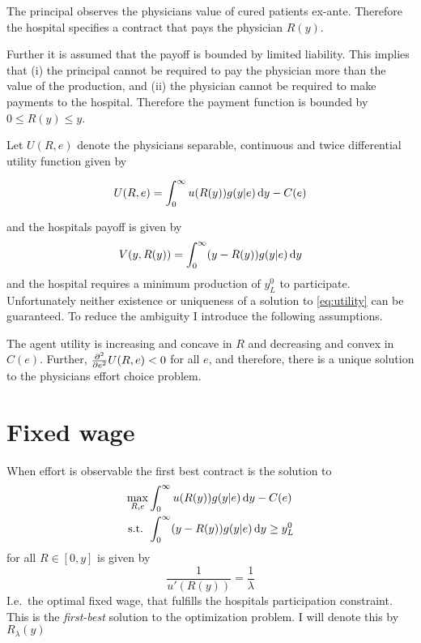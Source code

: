 The principal observes the physicians value of cured patients ex-ante. Therefore the hospital specifies a contract that pays the physician $R(y)$.

Further it is assumed that the payoff is bounded by limited liability. This implies that (i) the principal cannot be required to pay the physician more than the value of the production, and (ii) the physician cannot be required to make payments to the hospital.  Therefore the payment function is bounded by $0\leq R(y)\leq y$.

Let $U(R,e)$ denote the physicians separable, continuous and twice differential utility function given by 

\begin{align}
    U(R,e)=\int_0^\infty u(R(y))g(y|e)\dif y-C(e) \label{eq:utility}
\end{align}

and the hospitals payoff is given by 
\begin{align}
    V(y,R(y))=\int_0^\infty (y-R(y))g(y|e)\dif y
\end{align}
and the hospital requires a minimum production of $y_L^0$ to participate. 
Unfortunately neither existence or uniqueness of a solution to \cref{eq:utility} can be guaranteed. To reduce the ambiguity I introduce the following assumptions. 
\begin{assumption}
\label{asump:unique-solution}
The agent utility is increasing and concave in $R$ and decreasing and convex in $C(e)$. Further, $\pder[][2]{e}U(R,e)<0$ for all $e$, and therefore, there is a unique solution to the physicians effort choice problem.
\end{assumption}

\section{Fixed wage} %
\label{sec:fixed_wage}
When effort is observable the first best contract is the solution to 
\begin{subequations}
\label{eq:khun-tucker-fw}
\begin{align}
    \max_{R,e} & \int_0^{\infty}u(R(y))g(y|e)\dif y-C(e) \\
    \text{s.t. }    & \int_{0}^{\infty} (y-R(y))g(y|e)\dif y\geq y_L^0
\end{align}
\end{subequations}
for all $R\in[0,y]$ is given by 
\[
    \frac{1}{u'(R(y))}=\frac{1}{\lambda}
\]
I.e.\ the optimal fixed wage, that fulfills the hospitals participation constraint. This is the \emph{first-best} solution to the optimization problem. I will denote this by $R_\lambda(y)$

